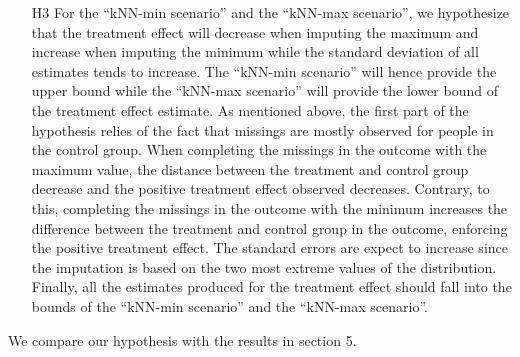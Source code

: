 \begin{itemize}
	\item[H3] For the ``kNN-min scenario'' and the ``kNN-max scenario'', we hypothesize that the treatment effect will decrease when imputing the maximum and increase when imputing the minimum while the standard deviation of all estimates tends to increase. The ``kNN-min scenario'' will hence provide the upper bound while the ``kNN-max scenario'' will provide the lower bound of the treatment effect estimate. As mentioned above, the first part of the hypothesis relies of the fact that missings are mostly observed for people in the control group. When completing the missings in the outcome with the maximum value, the distance between the treatment and control group decrease and the positive treatment effect observed decreases. Contrary, to this, completing the missings in the outcome with the minimum increases the difference between the treatment and control group in the outcome, enforcing the positive treatment effect. The standard errors are expect to increase since the imputation is based on the two most extreme values of the distribution. Finally, all the estimates produced for the treatment effect should fall into the bounds of the ``kNN-min scenario'' and the ``kNN-max scenario''.

\end{itemize}

We compare our hypothesis with the results in section 5.


